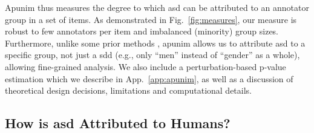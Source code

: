 \documentclass[manuscript,screen,review,anonymous]{acmart}
\theoremstyle{acmplain}
\theoremstyle{researchquestionstyle}
\begin{document}
Apunim thus measures the degree to which  \ac{asd} can be attributed to an annotator group in a set of items. As demonstrated in Fig.~\ref{fig:measures}, our measure is robust to few annotators per item and imbalanced (minority) group sizes. Furthermore, unlike some prior methods \citep{akhtar_2019, checco_2017}, apunim allows us to attribute \ac{asd} to a specific group, not just a \ac{sdd} (e.g., only ``men'' instead of ``gender'' as a whole), allowing fine-grained analysis. We also include a perturbation-based p-value estimation which we describe in App.~\ref{app:apunim}, as well as a discussion of theoretical design decisions, limitations and computational details.


\subsection{How is \ac{asd} Attributed to Humans?}
\end{document}
